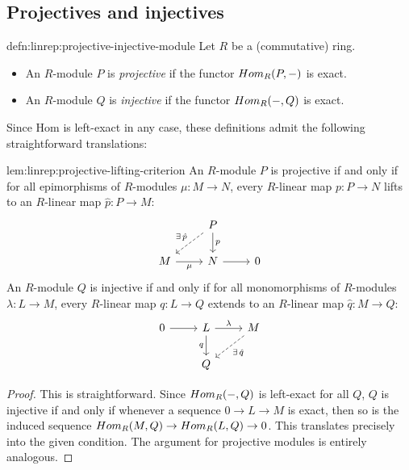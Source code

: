 \subsection{Projectives and injectives}
\label{subsec:linrep:projectives-and-injectives}

\begin{defn}{}{defn:linrep:projective-injective-module}
  Let $R$ be a (commutative) ring.
  \begin{itemize}
  \item An $R$-module $P$ is \emph{projective} if the functor
    $Hom_R(P, -)$ is exact.
  \item An $R$-module $Q$ is \emph{injective} if the functor
    $Hom_R(-, Q)$ is exact.
  \end{itemize}
\end{defn}

Since Hom is left-exact in any case, these definitions admit the
following straightforward translations:

\begin{lem}{}{lem:linrep:projective-lifting-criterion}
  An $R$-module $P$ is projective if and only if for all epimorphisms
  of $R$-modules $\mu : M \to N$, every $R$-linear map $p : P \to N$
  lifts to an $R$-linear map $\hat{p} : P \to M$:
  \[
    \begin{tikzcd}
      & P \ar[d, "p"] \ar[dl, dashed, "\exists\,\hat{p}"'] \\
      M \ar[r, "\mu"'] & N \ar[r] & 0
    \end{tikzcd}
  \]
  An $R$-module $Q$ is injective if and only if for all monomorphisms
  of $R$-modules $\lambda : L \to M$, every $R$-linear map
  $q : L \to Q$ extends to an $R$-linear map $\hat{q} : M \to Q$:
  \[
    \begin{tikzcd}
      0 \ar[r] & L \ar[r, "\lambda"] \ar[d, "q"'] &
      M \ar[dl, dashed, "\exists\,\hat{q}"] \\
      & Q
    \end{tikzcd}
  \]
\end{lem}

\begin{proof}
  This is straightforward. Since $Hom_R(-,Q)$ is left-exact for all
  $Q$, $Q$ is injective if and only if whenever a sequence
  $0 \to L \to M$ is exact, then so is the induced sequence
  $Hom_R(M,Q) \to Hom_R(L,Q) \to 0$. This translates precisely into
  the given condition. The argument for projective modules is entirely
  analogous.
\end{proof}

